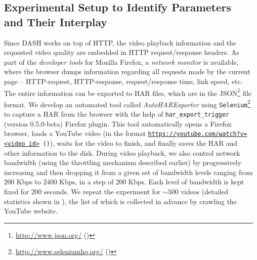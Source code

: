 \subsection{Experimental Setup to Identify Parameters and Their Interplay} 
Since \ac{DASH} works on top of \ac{HTTP}, the video playback information and the requested video quality are embedded in HTTP request/response headers.
As part of the {\em developer tools} for Mozilla Firefox, a {\em network monitor} is available, where the browser dumps information regarding all requests made by the current page -- \ac{HTTP}-request, \ac{HTTP}-response, request/response time, link speed, etc.
The entire information can be exported to \ac{HAR} files, which are in the \ac{JSON}\footnote{\url{http://www.json.org/} (\lastaccessedtoday)} file format.
We develop an automated tool called {\em AutoHARExporter} using \texttt{Selenium}\footnote{\url{http://www.seleniumhq.org/} (\lastaccessedtoday)} to capture a \ac{HAR} from the browser with the help of \texttt{har\_export\_trigger} (version 0.5.0-beta) Firefox plugin.
This tool automatically opens a Firefox browser, loads a YouTube video (in the format {\tt \url{https://youtube.com/watch?v=<video id>} (\lastaccessedtoday)}), waits for the video to finish, and finally saves the \ac{HAR} and other information to the disk.
During video playback, we also control network bandwidth (using the throttling mechanism described earlier) by progressively increasing and then dropping it from a given set of bandwidth levels ranging from $200$ Kbps to $2400$ Kbps, in a step of $200$ Kbps.
Each level of bandwidth is kept fixed for $200$ seconds. 
We repeat the experiment for $\sim500$ videos (detailed statistics shown in \tbl{\ref{table:chap03s1:statvid}}), the list of which is collected in advance by crawling the YouTube website.

